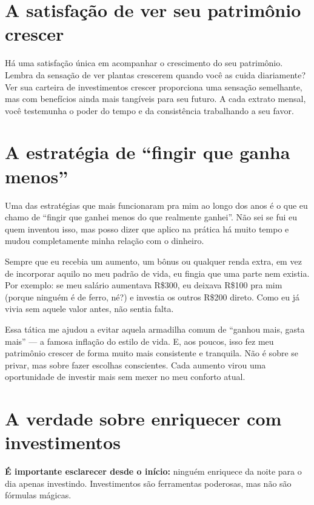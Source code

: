 \section{A satisfação de ver seu patrimônio crescer}

\noindent Há uma satisfação única em acompanhar o crescimento do seu patrimônio. Lembra da sensação de ver plantas crescerem quando você as cuida diariamente? Ver sua carteira de investimentos crescer proporciona uma sensação semelhante, mas com benefícios ainda mais tangíveis para seu futuro. A cada extrato mensal, você testemunha o poder do tempo e da consistência trabalhando a seu favor.

\section{A estratégia de ``fingir que ganha menos''}

\noindent Uma das estratégias que mais funcionaram pra mim ao longo dos anos é o que eu chamo de ``fingir que ganhei menos do que realmente ganhei''. Não sei se fui eu quem inventou isso, mas posso dizer que aplico na prática há muito tempo e mudou completamente minha relação com o dinheiro.

\vspace{0.5cm}
\noindent Sempre que eu recebia um aumento, um bônus ou qualquer renda extra, em vez de incorporar aquilo no meu padrão de vida, eu fingia que uma parte nem existia. Por exemplo: se meu salário aumentava R\$300, eu deixava R\$100 pra mim (porque ninguém é de ferro, né?) e investia os outros R\$200 direto. Como eu já vivia sem aquele valor antes, não sentia falta.

\vspace{0.5cm}
\noindent Essa tática me ajudou a evitar aquela armadilha comum de ``ganhou mais, gasta mais'' — a famosa inflação do estilo de vida. E, aos poucos, isso fez meu patrimônio crescer de forma muito mais consistente e tranquila. Não é sobre se privar, mas sobre fazer escolhas conscientes. Cada aumento virou uma oportunidade de investir mais sem mexer no meu conforto atual.

\section{A verdade sobre enriquecer com investimentos}

\noindent \textbf{É importante esclarecer desde o início:} ninguém enriquece da noite para o dia apenas investindo. Investimentos são ferramentas poderosas, mas não são fórmulas mágicas.

